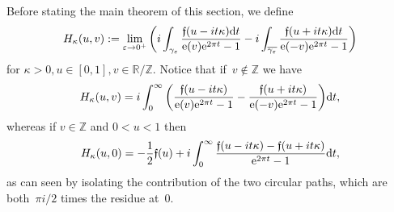 \documentclass[11pt]{amsart}
\newcommand{\eps}{\varepsilon}
\newcommand{\R}{\mathbb{R}}
\newcommand{\Z}{\mathbb{Z}}
\newcommand{\lf}{{\mathfrak f}}
\theoremstyle{definition}
\newcommand{\pr}[1]{\mathchoice{\left( #1\right)}{(#1)}{(#1)}{(#1)}}
\newcommand{\e}[1][]{\ifthenelse{\equal{#1}{}}{{\rm e}}{\operatorname{e}\pr{ #1}}}
\newcommand{\df}{\mathrm{d}}
\newcommand{\1}{{\mathbf 1}}
\let\originalleft\left
\let\originalright\right
\renewcommand{\left}{\mathopen{}\mathclose\bgroup\originalleft}
\renewcommand{\right}{\aftergroup\egroup\originalright}
\numberwithin{equation}{section}
\begin{document}
Before stating the main theorem of this section, we define
\begin{equation}\label{defh}
  H_\kappa(u, v) := 
  \lim_{\eps\to0^+}\bigg( i \int_{\gamma_\eps}  \frac{\lf(u - it\kappa )\df{t}}{\e[v]\e^{2\pi t}-1}- i \int_{\overline{\gamma_\eps}}  \frac{\lf(u + it\kappa)\df{t}}{\e[-v]\e^{2\pi t}-1}\bigg)
\end{equation}
for $\kappa>0, u\in[0,1], v\in\R/\Z$. Notice that if~$v\not\in\Z$ we have
\begin{equation}\label{sph1}
  H_\kappa(u, v) = i
  \int_{0}^\infty   \bigg( \frac{\lf(u - it\kappa )}{\e[v]\e^{2\pi t}-1}-   \frac{\lf(u + it\kappa )}{\e[-v]\e^{2\pi t}-1}\bigg)\df{t},
\end{equation}
whereas if $v\in\Z$ and $0<u<1$ then
\begin{equation}\label{sph2}
  H_{\kappa}(u, 0) = -\frac12 \lf(u) +i\int_{0}^\infty    \frac{\lf(u - it\kappa)-\lf(u + it \kappa)}{\e^{2\pi t}-1}\df{t} ,
\end{equation}
as can seen by isolating the contribution of the two circular paths, which are both~$\pi i/2$ times the residue at~$0$.
\end{document}
